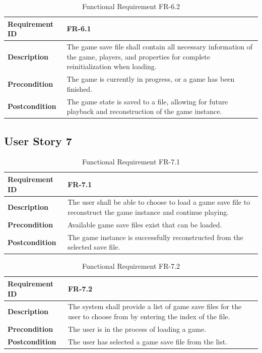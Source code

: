 \documentclass{article}
\begin{document}
\begin{table}[ht]
    \centering
    \caption{Functional Requirement FR-6.2}
    \begin{tabular}{@{}P{3cm}P{12cm}@{}}
        \toprule
        \textbf{Requirement ID} & FR-6.1 \\ \midrule
        \textbf{Description} & The game save file shall contain all necessary information of the game, players, and properties for complete reinitialization when loading. \\ \midrule
        \textbf{Precondition} & The game is currently in progress, or a game has been finished. \\ \midrule
        \textbf{Postcondition} & The game state is saved to a file, allowing for future playback and reconstruction of the game instance. \\ \bottomrule
    \end{tabular}
\end{table}

\clearpage
\subsection{User Story 7}

\begin{table}[ht]
    \centering
    \caption{Functional Requirement FR-7.1}
    \begin{tabular}{@{}P{3cm}P{12cm}@{}}
        \toprule
        \textbf{Requirement ID} & FR-7.1 \\ \midrule
        \textbf{Description} & The user shall be able to choose to load a game save file to reconstruct the game instance and continue playing. \\ \midrule
        \textbf{Precondition} & Available game save files exist that can be loaded. \\ \midrule
        \textbf{Postcondition} & The game instance is successfully reconstructed from the selected save file. \\ \bottomrule
    \end{tabular}
\end{table}

\begin{table}[ht]
    \centering
    \caption{Functional Requirement FR-7.2}
    \begin{tabular}{@{}P{3cm}P{12cm}@{}}
        \toprule
        \textbf{Requirement ID} & FR-7.2 \\ \midrule
        \textbf{Description} & The system shall provide a list of game save files for the user to choose from by entering the index of the file. \\ \midrule
        \textbf{Precondition} & The user is in the process of loading a game. \\ \midrule
        \textbf{Postcondition} & The user has selected a game save file from the list. \\ \bottomrule
    \end{tabular}
\end{table}
\end{document}
